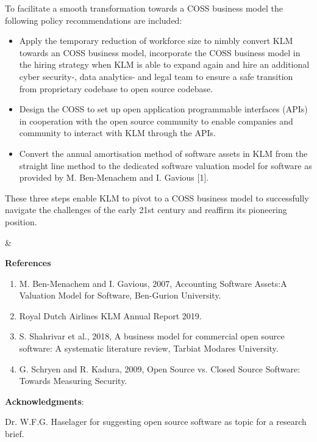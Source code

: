 \documentclass[portrait,a0paper]{rudi-poster}  %
\newcommand{\References}{
    \textbf{References}%
    \begin{enumerate}
    \itemsep-1em 
\item  M. Ben-Menachem and I. Gavious, 2007, Accounting Software Assets:A Valuation Model for Software,  Ben-Gurion University.\\ %
\item Royal Dutch Airlines KLM Annual Report 2019.\\ %
\item S. Shahrivar et al., 2018, A business model for commercial open source software: A systematic literature review, Tarbiat Modares University.\\ %
\item G. Schryen and R. Kadura, 2009, Open Source vs. Closed Source Software: Towards Measuring Security. %
\end{enumerate}}
\newcommand{\Acknowledgments}{
	\textbf{Acknowledgments}:
    \begin{itemize*}[label=]
    	\item Dr. W.F.G. Haselager for suggesting open source software as topic for a research brief.
    \end{itemize*}}
\begin{document}

\begin{paralleltwoblocks}{0.67}
    \begin{rudiblockipolicyrecommendations}
        \begin{multicols}{2}
            To facilitate a smooth transformation towards a COSS business model the following policy recommendations are included:
            \begin{itemize}
                \item Apply the temporary reduction of workforce size to nimbly convert KLM towards an COSS business model, incorporate the COSS business model in the hiring strategy when KLM is able to expand again and hire an additional cyber security-, data analytics- and legal team to ensure a safe transition from proprietary codebase to open source codebase.
                \item Design the COSS to set up open application programmable interfaces (APIs) in cooperation with the open source community to enable companies and community to interact with KLM through the APIs.
                \item Convert the annual amortisation method of software assets in KLM from the straight line method to the dedicated software valuation model for software as provided by M. Ben-Menachem and I. Gavious [1].
            \end{itemize}
            These three steps enable KLM to pivot to a COSS business model to successfully navigate the challenges of the early 21st century and reaffirm its pioneering position.
        \end{multicols}
    \end{rudiblockipolicyrecommendations}
    &
    {
    \begin{rudiblockaddendum}
    	\small
    	\References\par
        \Acknowledgments\par
        

\end{rudiblockaddendum}}
\end{paralleltwoblocks}
\end{document}
